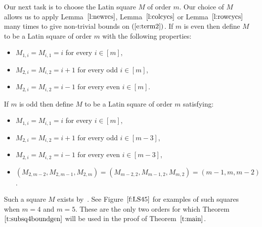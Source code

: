 \documentclass[12pt]{article}
\theoremstyle{definition}
\numberwithin{equation}{section}
\def\eref#1{$(\ref{#1})$}
\def\lref#1{Lemma~$\ref{#1}$}
\def\tref#1{Theorem~$\ref{#1}$}
\def\fref#1{Figure~$\ref{#1}$}
\begin{document}
	Our next task is to choose the Latin square $M$ of order $m$. Our
	choice of $M$ allows us to apply \lref{l:newrcs}, \lref{l:colcycs} or
	\lref{l:rowcycs} many times to give non-trivial bounds on
	\eref{e:term2}. If $m$ is even then define $M$ to be a Latin square of
	order $m$ with the following properties:
	\begin{itemize}
		\item $M_{1, i} = M_{i, 1} = i$ for every $i \in [m]$,
		\item $M_{2, i} = M_{i, 2} = i+1$ for every odd $i \in [m]$,
		\item $M_{2, i} = M_{i, 2} = i-1$ for every even $i \in [m]$.
	\end{itemize}
	If $m$ is odd then define $M$ to be a Latin square of order $m$ satisfying:
	\begin{itemize}
		\item $M_{1, i} = M_{i, 1} = i$ for every $i \in [m]$, 
		\item $M_{2, i} = M_{i, 2} = i+1$ for every odd $i \in [m-3]$,
		\item $M_{2, i} = M_{i, 2} = i-1$ for every even $i \in [m-3]$,
		\item $(M_{2, m-2}, M_{2, m-1}, M_{2, m}) = (M_{m-2, 2}, M_{m-1, 2}, M_{m, 2}) = (m-1, m, m-2)$.
	\end{itemize}
	Such a square $M$ exists
	by~\cite[Theorem~$1.5$]{2rows2cols}. See \fref{f:LS45} 
	for examples of such squares when $m=4$ and $m=5$. These are the only
	two orders for which \tref{t:subsq4boundgen} will be used
	in the proof of \tref{t:main}.
	
\end{document}
